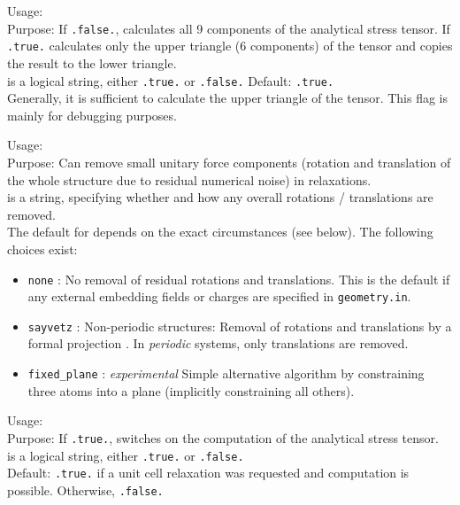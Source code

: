 {
  \noindent
  Usage:   \\[1.0ex]
  Purpose: If \texttt{.false.}, calculates all 9 components of the analytical
  stress tensor. If \texttt{.true.} calculates only the upper triangle (6
  components) of the tensor and copies the result to the lower triangle. \\[1.0ex] 
   is a logical string, either \texttt{.true.} or
    \texttt{.false.} Default: \texttt{.true.}\\
}
Generally, it is sufficient to calculate the upper triangle of the
tensor. This flag is mainly for debugging purposes.

{
  \noindent
  Usage:   \\[1.0ex]
  Purpose: Can remove small unitary force components (rotation and
    translation of the whole structure due to residual numerical
    noise) in relaxations. \\[1.0ex] 
   is a string, specifying whether and how any overall
    rotations / translations are removed. \\
}
The default for  depends on the exact circumstances (see
below). The following choices exist: 
\begin{itemize}
  \item \texttt{none} : No removal of residual rotations and
    translations. This is the default if any external embedding fields
    or charges are specified in \texttt{geometry.in}.
  \item \texttt{sayvetz} : Non-periodic structures: Removal of
    rotations and translations by a formal projection
    \cite{Eckart35,Sayvetz39}. In \emph{periodic} systems,
    only translations are removed.
  \item \texttt{fixed\_plane} : \emph{experimental} Simple alternative
    algorithm by constraining three atoms into a plane (implicitly
    constraining all others). 
\end{itemize}

{
  \noindent
  Usage:   \\[1.0ex]
  Purpose: If \texttt{.true.}, switches on the computation of
  the analytical stress tensor. \\[1.0ex] 
   is a logical string, either \texttt{.true.} or
    \texttt{.false.} \\
}
Default: \texttt{.true.} if a unit cell relaxation was requested and computation
is possible. Otherwise, \texttt{.false.}

